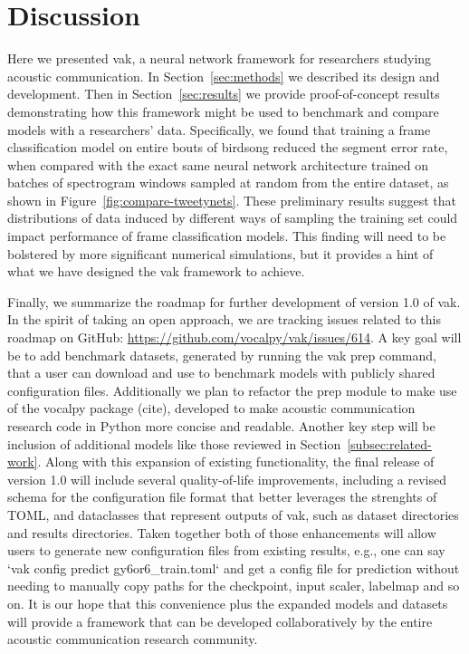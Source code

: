 \section{Discussion \label{sec:results}}

Here we presented vak, a neural network framework for researchers studying acoustic communication. In Section~\ref{sec:methods} we described its design and development. Then in Section~\ref{sec:results} we provide proof-of-concept results demonstrating how this framework might be used to benchmark and compare models with a researchers' data. Specifically, we found that training a frame classification model on entire bouts of birdsong reduced the segment error rate, when compared with the exact same neural network architecture trained on batches of spectrogram windows sampled at random from the entire dataset, as shown in Figure~\ref{fig:compare-tweetynets}. These preliminary results suggest that distributions of data induced by different ways of sampling the training set could impact performance of frame classification models. This finding will need to be bolstered by more significant numerical simulations, but it provides a hint of what we have designed the vak framework to achieve.

Finally, we summarize the roadmap for further development of version 1.0 of vak.
In the spirit of taking an open approach,
we are tracking issues related to this roadmap on GitHub:
\url{https://github.com/vocalpy/vak/issues/614}.
A key goal will be to add benchmark datasets,
generated by running the vak prep command,
that a user can download and use
to benchmark models with publicly shared configuration files.
Additionally we plan to refactor the prep module
to make use of the vocalpy package (cite),
developed to make acoustic communication research code
in Python more concise and readable.
Another key step will be inclusion of additional models
like those reviewed in Section~\ref{subsec:related-work}.
Along with this expansion of existing functionality,
the final release of version 1.0 will include several quality-of-life
improvements, including a revised schema for the configuration file format
that better leverages the strenghts of TOML,
and dataclasses that represent outputs of vak,
such as dataset directories and results directories.
Taken together both of those enhancements
will allow users to generate new configuration files
from existing results,
e.g., one can say `vak config predict gy6or6_train.toml`
and get a config file for prediction
without needing to manually copy paths
for the checkpoint, input scaler, labelmap and so on.
It is our hope that this convenience
plus the expanded models and datasets
will provide a framework that
can be developed collaboratively by the entire
acoustic communication research community.